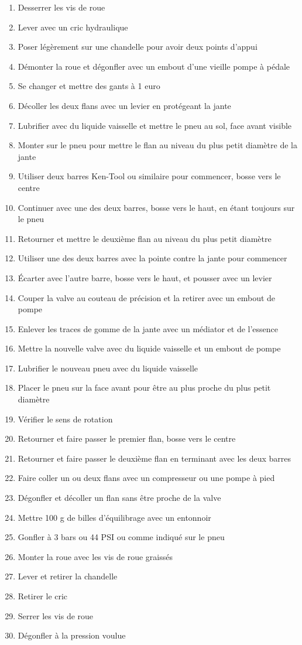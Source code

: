 \documentclass{livret}
\begin{document}
\begin{enumerate}
\item Desserrer les vis de roue
\item Lever avec un cric hydraulique
\item Poser légèrement sur une chandelle pour avoir deux points d'appui
\item Démonter la roue et dégonfler avec un embout d'une vieille pompe à pédale
\item Se changer et mettre des gants à 1 euro
\item Décoller les deux flans avec un levier en protégeant la jante
\item Lubrifier avec du liquide vaisselle et mettre le pneu au sol, face avant visible
\item Monter sur le pneu pour mettre le flan au niveau du plus petit diamètre de la jante
\item Utiliser deux barres Ken-Tool ou similaire pour commencer, bosse vers le centre
\item Continuer avec une des deux barres, bosse vers le haut, en étant toujours sur le pneu
\item Retourner et mettre le deuxième flan au niveau du plus petit diamètre
\item Utiliser une des deux barres avec la pointe contre la jante pour commencer
\item Écarter avec l'autre barre, bosse vers le haut, et pousser avec un levier
\item Couper la valve au couteau de précision et la retirer avec un embout de pompe
\item Enlever les traces de gomme de la jante avec un médiator et de l'essence
\item Mettre la nouvelle valve avec du liquide vaisselle et un embout de pompe
\item Lubrifier le nouveau pneu avec du liquide vaisselle
\item Placer le pneu sur la face avant pour être au plus proche du plus petit diamètre
\item Vérifier le sens de rotation
\item Retourner et faire passer le premier flan, bosse vers le centre
\item Retourner et faire passer le deuxième flan en terminant avec les deux barres
\item Faire coller un ou deux flans avec un compresseur ou une pompe à pied
\item Dégonfler et décoller un flan sans être proche de la valve
\item Mettre 100 \si{g} de billes d'équilibrage avec un entonnoir
\item Gonfler à 3 bars ou 44 PSI ou comme indiqué sur le pneu
\item Monter la roue avec les vis de roue graissés
\item Lever et retirer la chandelle
\item Retirer le cric
\item Serrer les vis de roue
\item Dégonfler à la pression voulue
\end{enumerate}
\end{document}
